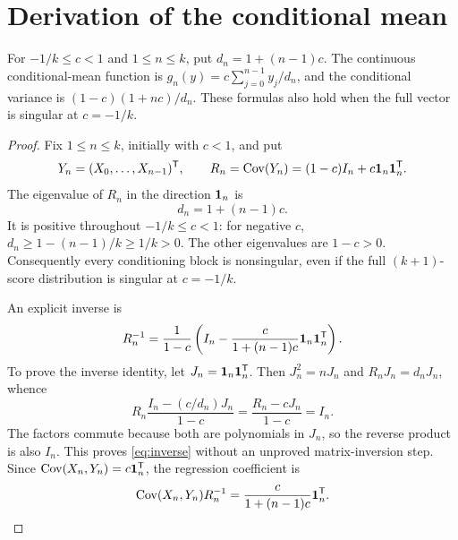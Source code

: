 \chapter{Derivation of the conditional mean}

\begin{theorem}
\label{thm:equicorrelated-conditioning}
For \(-1/k\leq c<1\) and \(1\leq n\leq k\), put
\(d_n=1+(n-1)c\). The continuous conditional-mean function is
\(g_n(y)=c\sum_{j=0}^{n-1}y_j/d_n\), and the conditional variance is
\((1-c)(1+nc)/d_n\). These formulas also hold when the full vector is
singular at \(c=-1/k\).
\end{theorem}
\begin{proof}

Fix \(1\leq n\leq k\), initially with \(c<1\), and put
\[
  Y_n=(X_0,\ldots,X_{n-1})^{\mathsf{T}},\qquad
  R_n=\operatorname{Cov}(Y_n)=(1-c)I_n+c\mathbf{1}_n\mathbf{1}_n^{\mathsf{T}}.
\]
The eigenvalue of \(R_n\) in the direction \(\mathbf{1}_n\) is
\[
  d_n=1+(n-1)c.
\]
It is positive throughout \(-1/k\leq c<1\): for negative \(c\),
\(d_n\geq1-(n-1)/k\geq1/k>0\). The other eigenvalues are \(1-c>0\).
Consequently every conditioning block is nonsingular, even if the full
\((k+1)\)-score distribution is singular at \(c=-1/k\).

An explicit inverse is
\begin{equation}
  R_n^{-1}=\frac1{1-c}
  \left(I_n-\frac{c}{1+(n-1)c}\mathbf{1}_n\mathbf{1}_n^{\mathsf{T}}\right).
  \label{eq:inverse}
\end{equation}
To prove the inverse identity, let \(J_n=\mathbf{1}_n\mathbf{1}_n^{\mathsf{T}}\). Then
\(J_n^2=nJ_n\) and \(R_nJ_n=d_nJ_n\), whence
\[
 R_n\frac{I_n-(c/d_n)J_n}{1-c}
 =\frac{R_n-cJ_n}{1-c}=I_n.
\]
The factors commute because both are polynomials in \(J_n\), so the reverse
product is also \(I_n\). This proves \eqref{eq:inverse} without an unproved
matrix-inversion step.
Since \(\operatorname{Cov}(X_n,Y_n)=c\mathbf{1}_n^{\mathsf{T}}\), the regression coefficient is
\begin{equation}
  \operatorname{Cov}(X_n,Y_n)R_n^{-1}
    =\frac{c}{1+(n-1)c}\mathbf{1}_n^{\mathsf{T}}.
  \label{eq:coefficient}
\end{equation}


\end{proof}
